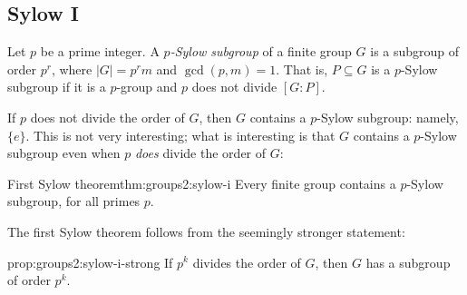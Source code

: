 \subsection{Sylow I}
\label{subsec:groups2:sylow-i}
Let $p$ be a prime integer. A \emph{$p$-Sylow subgroup} of a finite
group $G$ is a subgroup of order $p^r$, where $|G| = p^r m$ and
$\gcd(p, m) = 1$. That is, $P \subseteq G$ is a $p$-Sylow subgroup if
it is a $p$-group and $p$ does not divide $[G : P]$.

If $p$ does not divide the order of $G$, then $G$ contains a $p$-Sylow
subgroup: namely, $\{e\}$. This is not very interesting; what is
interesting is that $G$ contains a $p$-Sylow subgroup even when $p$
\emph{does} divide the order of $G$:
\begin{thm}{First Sylow theorem}{thm:groups2:sylow-i}
  Every finite group contains a $p$-Sylow subgroup, for all primes
  $p$.
\end{thm}

The first Sylow theorem follows from the seemingly stronger statement:
\begin{prop}{}{prop:groups2:sylow-i-strong}
  If $p^k$ divides the order of $G$, then $G$ has a subgroup of order
  $p^k$.
\end{prop}

